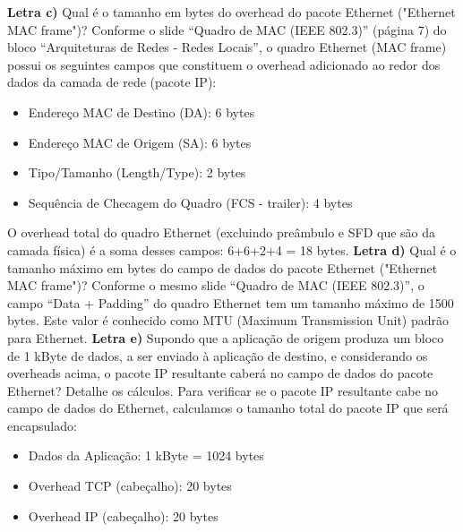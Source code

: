 \textbf{Letra c)} Qual é o tamanho em bytes do overhead do pacote Ethernet ("Ethernet MAC frame")?
\newline
Conforme o slide “Quadro de MAC (IEEE 802.3)” (página 7) do bloco “Arquiteturas de Redes - Redes Locais”, o quadro Ethernet (MAC frame) possui os seguintes campos que constituem o overhead adicionado ao redor dos dados da camada de rede (pacote IP):

\begin{itemize}
    \item Endereço MAC de Destino (DA): 6 bytes
    \item Endereço MAC de Origem (SA): 6 bytes
    \item Tipo/Tamanho (Length/Type): 2 bytes
    \item Sequência de Checagem do Quadro (FCS - trailer): 4 bytes
\end{itemize}

O overhead total do quadro Ethernet (excluindo preâmbulo e SFD que são da camada física) é a soma desses campos: 6+6+2+4 = 18 bytes.
\newline
\textbf{Letra d)} Qual é o tamanho máximo em bytes do campo de dados do pacote Ethernet ("Ethernet MAC frame")?
\newline
Conforme o mesmo slide “Quadro de MAC (IEEE 802.3)”, o campo “Data + Padding” do quadro Ethernet tem um tamanho máximo de 1500 bytes. Este valor é conhecido como MTU (Maximum Transmission Unit) padrão para Ethernet.
\newline
\textbf{Letra e)} Supondo que a aplicação de origem produza um bloco de 1 kByte de dados, a ser enviado à aplicação de destino, e considerando os overheads acima, o pacote IP resultante caberá no campo de dados do pacote Ethernet? Detalhe os cálculos.
\newline
Para verificar se o pacote IP resultante cabe no campo de dados do Ethernet, calculamos o tamanho total do pacote IP que será encapsulado:

\begin{itemize}
    \item Dados da Aplicação: 1 kByte = 1024 bytes
    \item Overhead TCP (cabeçalho): 20 bytes
    \item Overhead IP (cabeçalho): 20 bytes
\end{itemize}

